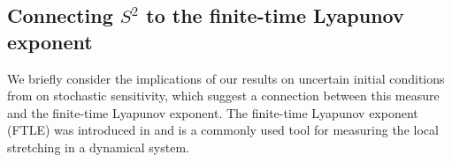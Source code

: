 


\subsection{Connecting \(S^2\) to the finite-time Lyapunov exponent}\label{sec:ftle_s2_connection}
We briefly consider the implications of our results on uncertain initial conditions from  on stochastic sensitivity, which suggest a connection between this measure and the finite-time Lyapunov exponent.
The finite-time Lyapunov exponent (FTLE) was introduced in  and is a commonly used tool for measuring the local stretching in a dynamical system.

